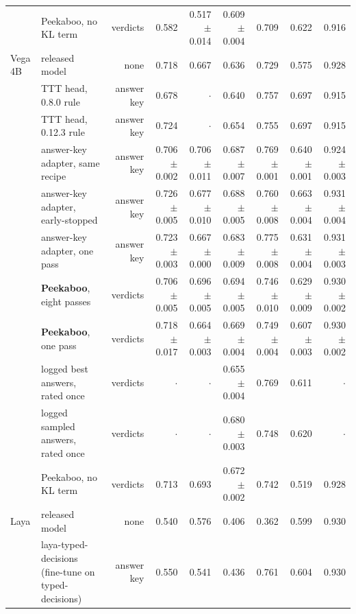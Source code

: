 \begin{table}[tbp]
{\begin{tabular}{llrrrrrrr}
 & Peekaboo, no KL term & verdicts & 0.582 & 0.517 {\scriptsize$\pm$0.014} & 0.609 {\scriptsize$\pm$0.004} & 0.709 & 0.622 & 0.916 \\
\addlinespace
Vega 4B & released model & none & 0.718 & 0.667 & 0.636 & 0.729 & 0.575 & 0.928 \\
 & TTT head, 0.8.0 rule & answer key & 0.678 & $\cdot$ & 0.640 & 0.757 & 0.697 & 0.915 \\
 & TTT head, 0.12.3 rule & answer key & 0.724 & $\cdot$ & 0.654 & 0.755 & 0.697 & 0.915 \\
 & answer-key adapter, same recipe & answer key & 0.706 {\scriptsize$\pm$0.002} & 0.706 {\scriptsize$\pm$0.011} & 0.687 {\scriptsize$\pm$0.007} & 0.769 {\scriptsize$\pm$0.001} & 0.640 {\scriptsize$\pm$0.001} & 0.924 {\scriptsize$\pm$0.003} \\
 & answer-key adapter, early-stopped & answer key & 0.726 {\scriptsize$\pm$0.005} & 0.677 {\scriptsize$\pm$0.010} & 0.688 {\scriptsize$\pm$0.005} & 0.760 {\scriptsize$\pm$0.008} & 0.663 {\scriptsize$\pm$0.004} & 0.931 {\scriptsize$\pm$0.004} \\
 & answer-key adapter, one pass & answer key & 0.723 {\scriptsize$\pm$0.003} & 0.667 {\scriptsize$\pm$0.000} & 0.683 {\scriptsize$\pm$0.009} & 0.775 {\scriptsize$\pm$0.008} & 0.631 {\scriptsize$\pm$0.004} & 0.931 {\scriptsize$\pm$0.003} \\
 & \textbf{Peekaboo}, eight passes & verdicts & 0.706 {\scriptsize$\pm$0.005} & 0.696 {\scriptsize$\pm$0.005} & 0.694 {\scriptsize$\pm$0.005} & 0.746 {\scriptsize$\pm$0.010} & 0.629 {\scriptsize$\pm$0.009} & 0.930 {\scriptsize$\pm$0.002} \\
 & \textbf{Peekaboo}, one pass & verdicts & 0.718 {\scriptsize$\pm$0.017} & 0.664 {\scriptsize$\pm$0.003} & 0.669 {\scriptsize$\pm$0.004} & 0.749 {\scriptsize$\pm$0.004} & 0.607 {\scriptsize$\pm$0.003} & 0.930 {\scriptsize$\pm$0.002} \\
 & logged best answers, rated once & verdicts & $\cdot$ & $\cdot$ & 0.655 {\scriptsize$\pm$0.004} & 0.769 & 0.611 & $\cdot$ \\
 & logged sampled answers, rated once & verdicts & $\cdot$ & $\cdot$ & 0.680 {\scriptsize$\pm$0.003} & 0.748 & 0.620 & $\cdot$ \\
 & Peekaboo, no KL term & verdicts & 0.713 & 0.693 & 0.672 {\scriptsize$\pm$0.002} & 0.742 & 0.519 & 0.928 \\
\addlinespace
Laya & released model & none & 0.540 & 0.576 & 0.406 & 0.362 & 0.599 & 0.930 \\
 & laya-typed-decisions (fine-tune on typed-decisions) & answer key & 0.550 & 0.541 & 0.436 & 0.761 & 0.604 & 0.930 \\

\end{tabular}}
\end{table}
